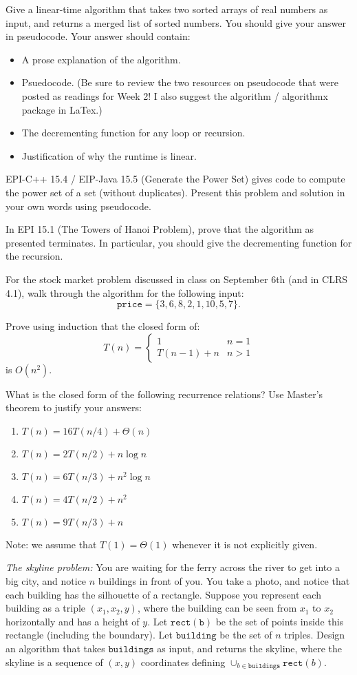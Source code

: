 \documentclass{article}
\author{TODO-Your Group Number and Names Here}
\date{due: 20 September 2019}
\begin{document}
\nextprob
Give a linear-time algorithm that takes two sorted arrays of real numbers as
input, and returns a merged list of sorted numbers.  You should give your answer
in pseudocode.    Your answer should contain:
\begin{itemize}
\item A prose explanation of the algorithm.
\item Psuedocode. (Be sure to review the two resources on pseudocode that were
posted as readings for Week 2!  I also suggest the algorithm /
algorithmx package in LaTex.)
\item The decrementing function for any loop or recursion.
\item Justification of why the runtime is linear.
\end{itemize}

\nextprob
EPI-C++ 15.4 / EIP-Java 15.5 (Generate the Power Set) gives code to compute the power set of a set
(without duplicates).  Present this problem and solution in your own words using
pseudocode.

\nextprob
In EPI 15.1 (The Towers of Hanoi Problem), prove that the algorithm as presented
terminates.  In particular, you should give the decrementing function for the
recursion.

\nextprob
For the stock market problem discussed in class on September 6th (and in CLRS
4.1), walk through
the algorithm for the following input:
$$\mathtt{price} = \{ 3, 6, 8, 2, 1, 10, 5, 7 \}. $$

\nextprob
Prove using induction that the closed form of:
$$T(n) = \begin{cases}
1        & n=1\\
T(n-1)+n & n>1
\end{cases}
$$
is $O(n^2)$.

\nextprob
What is the closed form of the following recurrence relations?  Use Master's
theorem to justify your answers:
\begin{enumerate}
\item $T(n) = 16 T(n/4) + \Theta(n)$
\item $T(n) = 2 T(n/2) + n \log{n}$
\item $T(n) = 6 T(n/3) + n^2 \log{n}$
\item $T(n) = 4 T(n/2) + n^2$
\item $T(n) = 9 T(n/3) + n$
\end{enumerate}
Note: we assume that $T(1)=\Theta(1)$ whenever it is not explicitly given.

\nextprob
\emph{The skyline problem:} You are waiting for the ferry across the river to
get into a big city, and notice
$n$ buildings in front of you.  You take a photo, and notice that each building
has the silhouette of a rectangle.  Suppose you  represent each building as a
triple $(x_1,x_2,y)$, where the building can be seen from $x_1$ to $x_2$
horizontally and has a height of $y$.  Let $\mathtt{rect(b)}$ be the set of
points inside this rectangle (including the boundary).  Let $\mathtt{building}$ be the set of $n$
triples. Design an algorithm that takes $\mathtt{buildings}$ as input, and
returns the skyline, where the skyline is a sequence of $(x,y)$ coordinates
defining $\cup_{b \in \mathtt{buildings}} \mathtt{rect}(b)$.
\end{document}
